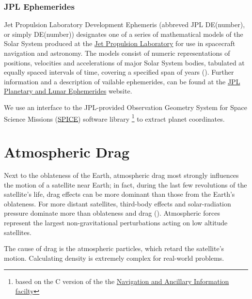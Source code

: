 \subsubsection{JPL Ephemerides}
Jet Propulsion Laboratory Development Ephemeris (abbreved JPL DE(number), or 
simply DE(number)) designates one of a series of mathematical models of the 
Solar System produced at the \href{https://www.jpl.nasa.gov/}{Jet Propulsion Laboratory} 
for use in spacecraft navigation and astronomy. The models consist of numeric 
representations of positions, velocities and accelerations of major Solar System 
bodies, tabulated at equally spaced intervals of time, covering a specified 
span of years (\cite{wiki-jplde}). Further information and a description of 
vailable ephemerides, can be found at the 
\href{https://ssd.jpl.nasa.gov/planets/eph_export.html}{JPL Planetary and Lunar Ephemerides} website.

We use an interface to the JPL-provided Observation Geometry System
for Space Science Missions (\href{https://naif.jpl.nasa.gov/naif/}{SPICE}) 
software library \footnote{based on the C version of the the 
\href{https://naif.jpl.nasa.gov/naif/toolkit_C.html}{Navigation and Ancillary Information facilty}} 
to extract planet coordinates. 

\section{Atmospheric Drag}
Next to the oblateness of the Earth, atmospheric drag most strongly influences the
motion of a satellite near Earth; in fact, during the last few revolutions of the satellite's
life, drag effects can be more dominant than those from the Earth's oblateness. For more
distant satellites, third-body effects and solar-radiation pressure dominate more than
oblateness and drag (\cite{Vallado}). Atmospheric forces represent the largest 
non-gravitational perturbations acting on low altitude satellites.

The cause of drag is the atmospheric particles, which retard the satellite's motion.
Calculating density is extremely complex for real-world problems.

